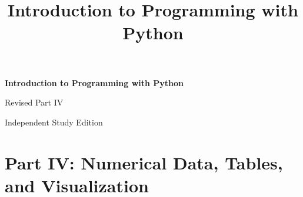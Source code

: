 \documentclass{textbook}
\title{Introduction to Programming with Python}
\providecommand{\toc}{\tableofcontents}
\begin{document}
\begin{titlepage}
    \centering
    \vspace*{0.22\textheight}
    {\Huge\bfseries Introduction to Programming with Python\par}
    \vspace{1.2em}
    {\Large Revised Part IV\par}
    \vspace{0.8em}
    {\large Independent Study Edition\par}
    \vfill
\end{titlepage}

\toc
\clearpage

\part{Part IV: Numerical Data, Tables, and Visualization}



\end{document}
